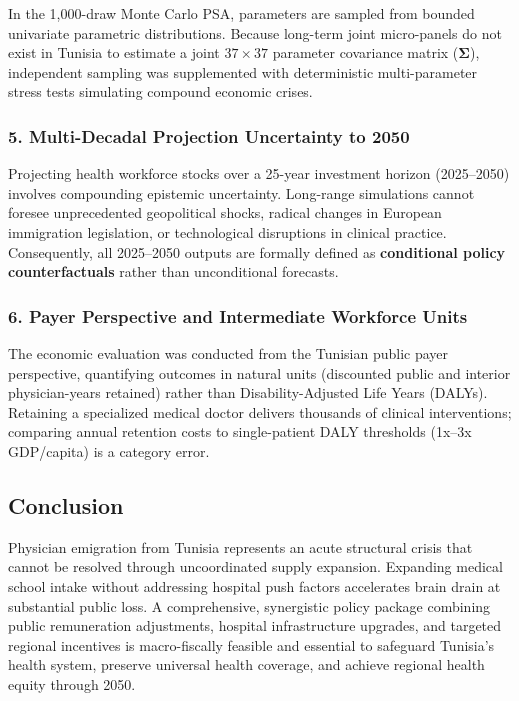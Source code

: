 \documentclass[
  11pt,
  a4paper]{article}
\begin{document}
In the 1,000-draw Monte Carlo PSA, parameters are sampled from bounded
univariate parametric distributions. Because long-term joint
micro-panels do not exist in Tunisia to estimate a joint
\(37 \times 37\) parameter covariance matrix (\(\boldsymbol{\Sigma}\)),
independent sampling was supplemented with deterministic multi-parameter
stress tests simulating compound economic crises.

\subsubsection{5. Multi-Decadal Projection Uncertainty to
2050}\label{multi-decadal-projection-uncertainty-to-2050}

Projecting health workforce stocks over a 25-year investment horizon
(2025--2050) involves compounding epistemic uncertainty. Long-range
simulations cannot foresee unprecedented geopolitical shocks, radical
changes in European immigration legislation, or technological
disruptions in clinical practice. Consequently, all 2025--2050 outputs
are formally defined as \textbf{conditional policy counterfactuals}
rather than unconditional forecasts.

\subsubsection{6. Payer Perspective and Intermediate Workforce
Units}\label{payer-perspective-and-intermediate-workforce-units}

The economic evaluation was conducted from the Tunisian public payer
perspective, quantifying outcomes in natural units (discounted public
and interior physician-years retained) rather than Disability-Adjusted
Life Years (DALYs). Retaining a specialized medical doctor delivers
thousands of clinical interventions; comparing annual retention costs to
single-patient DALY thresholds (1x--3x GDP/capita) is a category error.

\subsection{Conclusion}\label{sec-discussion-conclusion}

Physician emigration from Tunisia represents an acute structural crisis
that cannot be resolved through uncoordinated supply expansion.
Expanding medical school intake without addressing hospital push factors
accelerates brain drain at substantial public loss. A comprehensive,
synergistic policy package combining public remuneration adjustments,
hospital infrastructure upgrades, and targeted regional incentives is
macro-fiscally feasible and essential to safeguard Tunisia's health
system, preserve universal health coverage, and achieve regional health
equity through 2050.
\end{document}
